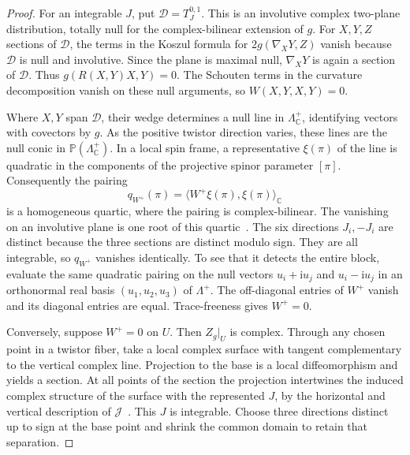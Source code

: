 \documentclass[11pt]{article}
\numberwithin{equation}{section}
\begin{document}
\begin{proof}
For an integrable \(J\), put \(\mathcal D=T^{0,1}_J\). This is an
involutive complex two-plane distribution, totally null for the
complex-bilinear extension of \(g\). For \(X,Y,Z\) sections of
\(\mathcal D\), the terms in the Koszul formula for
\(2g(\nabla_XY,Z)\) vanish because \(\mathcal D\) is null and
involutive. Since the plane is maximal null,
\(\nabla_XY\) is again a section of \(\mathcal D\). Thus
\(g(R(X,Y)X,Y)=0\). The Schouten terms in the curvature
decomposition vanish on these null arguments, so \(W(X,Y,X,Y)=0\).

Where \(X,Y\) span \(\mathcal D\), their wedge determines a null
line in \(\Lambda^+_{\mathbb C}\), identifying vectors with
covectors by \(g\). As the positive twistor direction varies, these
lines are the null conic in
\(\mathbb P(\Lambda^+_{\mathbb C})\). In a local spin frame, a
representative \(\xi(\pi)\) of the line is quadratic in the
components of the projective spinor parameter \([\pi]\).
Consequently the pairing
\[
 q_{W^+}(\pi)=\langle W^+\xi(\pi),\xi(\pi)\rangle_{\mathbb C}
\]
is a homogeneous quartic, where the pairing is complex-bilinear.
The vanishing on an involutive plane is one root of this
quartic~\cite[Remark~5.2, Proposition~5.3 and eqs.~(14)--(20)]{GoverHillNurowski2011GoldbergSachs}.
The six directions \(J_i,-J_i\) are distinct because the three
sections are distinct modulo sign. They are all integrable, so
\(q_{W^+}\) vanishes identically. To see that it detects the entire
block, evaluate the same quadratic pairing on the null vectors
\(u_i+\mathrm{i}u_j\) and \(u_i-\mathrm{i}u_j\) in an orthonormal
real basis \((u_1,u_2,u_3)\) of \(\Lambda^+\). The off-diagonal
entries of \(W^+\) vanish and its diagonal entries are equal.
Trace-freeness gives \(W^+=0\).

Conversely, suppose \(W^+=0\) on \(U\). Then \(Z_g|_U\) is complex.
Through any chosen point in a twistor fiber, take a local complex
surface with tangent complementary to the vertical complex line.
Projection to the base is a local diffeomorphism and yields a
section. At all points of the section the projection intertwines
the induced complex structure of the surface with the represented
\(J\), by the horizontal and vertical description of
\(\mathcal J\)~\cite[Theorem~4.1 and its remarks]{AHS1978}.
This \(J\) is integrable. Choose three directions distinct up to
sign at the base point and shrink the common domain to retain
that separation.
\end{proof}
\end{document}
